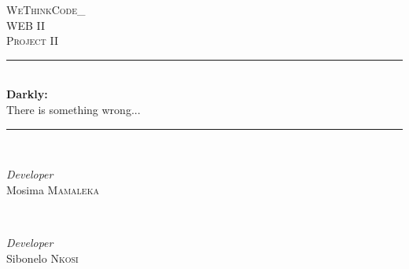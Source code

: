 \begin{titlepage} %
	\newcommand{\HRule}{\rule{\linewidth}{0.5mm}} %
	
	\center %
	
	
	\textsc{\LARGE WeThinkCode\_}\\[1.5cm] %
	
	\textsc{\Large WEB II}\\[0.5cm] %
	
	\textsc{\large Project II}\\[0.5cm] %
	
	
	\HRule\\[0.4cm]
	
	{\huge\bfseries Darkly: }\\{\large There is something wrong...}\\[0.4cm] %
	
	\HRule\\[1.5cm]
	
	
	\begin{minipage}{0.4\textwidth}
		\begin{flushleft}
			\large
			\textit{Developer}\\
			Mosima \textsc{Mamaleka} %
		\end{flushleft}
	\end{minipage}
	~
	\begin{minipage}{0.4\textwidth}
		\begin{flushright}
			\large
			\textit{Developer}\\
			Sibonelo \textsc{Nkosi} %
		\end{flushright}
	\end{minipage}
	


\end{titlepage}
